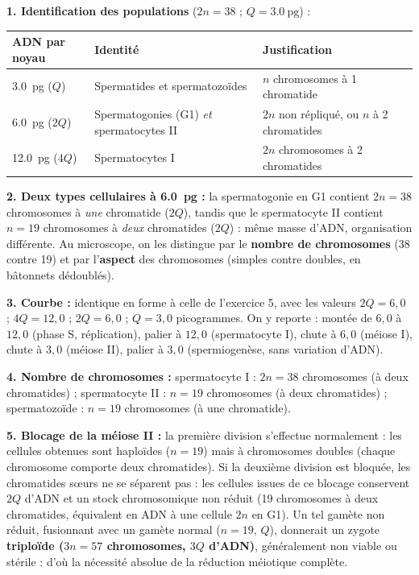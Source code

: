 \documentclass[11pt]{article}
\begin{document}
\begin{corrige}
\textbf{1. Identification des populations} ($2n = 38$ ; $Q = \SI{3,0}{\pico\gram}$) :
\begin{center}
\begin{tabularx}{\linewidth}{|l|X|X|}\hline
\rowcolor{popblueL} ADN par noyau & Identité & Justification \\ \hline
\SI{3,0}{\pico\gram} ($Q$) & Spermatides et spermatozoïdes & $n$ chromosomes à 1 chromatide \\ \hline
\SI{6,0}{\pico\gram} ($2Q$) & Spermatogonies (G1) \emph{et} spermatocytes II & $2n$ non répliqué, ou $n$ à 2 chromatides \\ \hline
\SI{12,0}{\pico\gram} ($4Q$) & Spermatocytes I & $2n$ chromosomes à 2 chromatides \\ \hline
\end{tabularx}
\end{center}

\textbf{2. Deux types cellulaires à \SI{6,0}{\pico\gram} :} la spermatogonie en G1 contient $2n = 38$ chromosomes à \emph{une} chromatide ($2Q$), tandis que le spermatocyte II contient $n = 19$ chromosomes à \emph{deux} chromatides ($2Q$) : même masse d'ADN, organisation différente. Au microscope, on les distingue par le \textbf{nombre de chromosomes} (38 contre 19) et par l'\textbf{aspect} des chromosomes (simples contre doubles, en bâtonnets dédoublés).

\textbf{3. Courbe :} identique en forme à celle de l'exercice 5, avec les valeurs $2Q = 6,0$ ; $4Q = 12,0$ ; $2Q = 6,0$ ; $Q = 3,0$ picogrammes. On y reporte : montée de $6,0$ à $12,0$ (phase S, réplication), palier à $12,0$ (spermatocyte I), chute à $6,0$ (méiose I), chute à $3,0$ (méiose II), palier à $3,0$ (spermiogenèse, sans variation d'ADN).

\textbf{4. Nombre de chromosomes :} spermatocyte I : $2n = 38$ chromosomes (à deux chromatides) ; spermatocyte II : $n = 19$ chromosomes (à deux chromatides) ; spermatozoïde : $n = 19$ chromosomes (à une chromatide).

\textbf{5. Blocage de la méiose II :} la première division s'effectue normalement : les cellules obtenues sont haploïdes ($n = 19$) mais à chromosomes doubles (chaque chromosome comporte deux chromatides). Si la deuxième division est bloquée, les chromatides s\oe urs ne se séparent pas : les cellules issues de ce blocage conservent $2Q$ d'ADN et un stock chromosomique non réduit (19 chromosomes à deux chromatides, équivalent en ADN à une cellule $2n$ en G1). Un tel gamète non réduit, fusionnant avec un gamète normal ($n = 19$, $Q$), donnerait un zygote \textbf{triploïde ($3n = 57$ chromosomes, $3Q$ d'ADN)}, généralement non viable ou stérile : d'où la nécessité absolue de la réduction méiotique complète.


\end{corrige}
\end{document}
